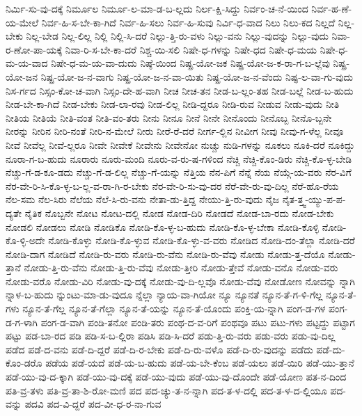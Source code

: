 {ನಿರ್ಮಿ-ಸು-ವು-ದಕ್ಕೆ
ನಿರ್ಮೂಲ
ನಿರ್ಮೂ-ಲ-ಮಾ-ಡ-ಬ-ಲ್ಲದು
ನಿರ್ಲ-ಕ್ಷಿ-ಸಿದ್ದು
ನಿರ್ವಂ-ಚ-ನೆ-ಯಿಂದ
ನಿರ್ವ-ಹ-ಣೆ-ಯ-ಮೇಲೆ
ನಿರ್ವ-ಹಿ-ಸ-ಬೇ-ಕಾ-ಗಿದೆ
ನಿರ್ವ-ಹಿ-ಸಲು
ನಿರ್ವ-ಹಿ-ಸುವು
ನಿರ್ವಿ-ಧ-ವಾದ
ನಿಲು
ನಿಲು-ಕದ
ನಿಲ್ಲದೆ
ನಿಲ್ಲ-ಬೇಕು
ನಿಲ್ಲ-ಬೇಡ
ನಿಲ್ಲ-ಲಿಲ್ಲ
ನಿಲ್ಲಿ
ನಿಲ್ಲಿ-ಸಿ-ದರೆ
ನಿಲ್ಲು-ತ್ತಿ-ರು-ವಳು
ನಿಲ್ಲು-ವನು
ನಿಲ್ಲು-ವುದನ್ನು
ನಿಲ್ಲು-ವುದು
ನಿವಾ-ರ-ಣೋ-ಪಾ-ಯಕ್ಕೆ
ನಿವಾ-ರಿ-ಸ-ಬೇ-ಕಾ-ದರೆ
ನಿಶ್ಚ-ಯಿ-ಸಲಿ
ನಿಷೇ-ಧ-ಗಳನ್ನು
ನಿಷೇ-ಧದ
ನಿಷೇ-ಧ-ಮಯ
ನಿಷೇ-ಧ-ಮ-ಯ-ವಾದ
ನಿಷೇ-ಧ-ಮ-ಯ-ವಾ-ದುದು
ನಿಷ್ಠೆ-ಯಿಂದ
ನಿಷ್ಪ್ರ-ಯೋ-ಜಕ
ನಿಷ್ಪ್ರ-ಯೋ-ಜ-ಕ-ರಾ-ಗ-ಬ-ಲ್ಲೆವು
ನಿಷ್ಪ್ರ-ಯೋ-ಜನ
ನಿಷ್ಪ್ರ-ಯೋ-ಜ-ನ-ವಾಗು
ನಿಷ್ಪ್ರ-ಯೋ-ಜ-ನ-ವಾ-ಯಿತು
ನಿಷ್ಪ್ರ-ಯೋ-ಜ-ನ-ವೆಂದು
ನಿಷ್ಫ-ಲ-ವಾ-ಗು-ವುದು
ನಿಸ-ರ್ಗದ
ನಿಸ್ಸಂ-ಕೋ-ಚ-ವಾಗಿ
ನಿಸ್ಸಂ-ದೇ-ಹ-ವಾಗಿ
ನೀಚ
ನೀಚ-ತನ
ನೀಡ-ಬ-ಲ್ಲಂ-ತಹ
ನೀಡ-ಬಲ್ಲೆ
ನೀಡ-ಬ-ಹುದು
ನೀಡ-ಬೇ-ಕಾ-ಗಿದೆ
ನೀಡ-ಬೇಕು
ನೀಡ-ಲಾ-ರವು
ನೀಡ-ಲಿಲ್ಲ
ನೀಡಿ-ದ್ದರೂ
ನೀಡಿ-ರುವ
ನೀಡುವ
ನೀಡು-ವುದು
ನೀತಿ
ನೀತಿಯ
ನೀತಿಯೆ
ನೀತಿ-ವಂತ
ನೀತಿ-ವಂ-ತರು
ನೀನು
ನೀನೂ
ನೀನೆ
ನೀನೇ
ನೀನೊಂದು
ನೀನೊಬ್ಬ
ನೀನೊ-ಬ್ಬನೇ
ನೀರನ್ನು
ನೀರಿನ
ನೀರಿ-ನಂತೆ
ನೀರಿ-ನ-ಮೇಲೆ
ನೀರು
ನೀರೆ-ರೆ-ದರೆ
ನೀರ್ಗ-ಲ್ಲಿನ
ನೀವೀಗ
ನೀವು
ನೀವು-ಗ-ಳೆಲ್ಲ
ನೀವೂ
ನೀವೆ
ನೀವೆಲ್ಲ
ನೀವೆ-ಲ್ಲರೂ
ನೀವೇ
ನೀವೇಕೆ
ನೀವೇನು
ನೀವೇನೋ
ನುಚ್ಚು
ನುಡಿ-ಗಳನ್ನು
ನೂಕಲು
ನೂಕಿ-ದರೆ
ನೂಕಿದ್ದು
ನೂರಾ-ಗ-ಬ-ಹುದು
ನೂರಾರು
ನೂರು-ಮಂದಿ
ನೂರು-ವ-ರು-ಷ-ಗಳಿಂದ
ನೆಚ್ಚಿ
ನೆಚ್ಚಿ-ಕೊಂ-ಡಿರು
ನೆಚ್ಚಿ-ಕೊ-ಳ್ಳ-ಬೇಡಿ
ನೆಚ್ಚು-ಗೆ-ಡ-ಕೂ-ಡದು
ನೆಚ್ಚು-ಗೆ-ಡ-ಲಿಲ್ಲ
ನೆಚ್ಚು-ಗೆ-ಯನ್ನು
ನೆತ್ತಿಯ
ನೆನ-ಪಿಗೆ
ನೆನ್ನೆ
ನೆಯ
ನೆಯ್ಗೆ-ಯ-ವರು
ನೆರ-ವಿಗೆ
ನೆರ-ವೇ-ರಿ-ಸಿ-ಕೊ-ಳ್ಳ-ಬ-ಲ್ಲ-ವ-ರಾ-ಗಿ-ರ-ಬೇಕು
ನೆರ-ವೇ-ರಿ-ಸು-ವು-ದರ
ನೆರೆ-ವೇ-ರು-ವು-ದಿಲ್ಲ
ನೆರೆ-ಹೊ-ರೆಯ
ನೆಲ-ಸಮ
ನೆಲ-ಸಿರು
ನೆಲೆಯ
ನೆಲೆ-ಸಿ-ರು-ವನು
ನೇತಾ-ಡು-ತ್ತಿದ್ದ
ನೇಯು-ತ್ತಿ-ರು-ವುದು
ನೈಜ
ನೈತ-ತ್ತ್ವ-ಯ್ಯು-ಪ-ಪ-ದ್ಯತೇ
ನೈತಿಕ
ನೊಬ್ಬನೇ
ನೋಟ
ನೋಟ-ದಲ್ಲಿ
ನೋಡ
ನೋಡ-ದಿರಿ
ನೋಡದೆ
ನೋಡ-ಬಾ-ರದು
ನೋಡ-ಬೇಕು
ನೋಡಲಿ
ನೋಡಲು
ನೋಡಿ
ನೋಡಿಕೊ
ನೋಡಿ-ಕೊ-ಳ್ಳ-ಬ-ಹುದು
ನೋಡಿ-ಕೊ-ಳ್ಳ-ಬೇಕಾ
ನೋಡಿ-ಕೊಳ್ಳಿ
ನೋಡಿ-ಕೊ-ಳ್ಳಿ-ಅದೇ
ನೋಡಿ-ಕೊಳ್ಳು
ನೋಡಿ-ಕೊ-ಳ್ಳುವ
ನೋಡಿ-ಕೊ-ಳ್ಳು-ವ-ವರು
ನೋಡಿದ
ನೋಡಿ-ದಂ-ತೆಲ್ಲಾ
ನೋಡಿ-ದರೆ
ನೋಡಿ-ದಾಗ
ನೋಡಿದೆ
ನೋಡಿ-ರು-ವರು
ನೋಡಿ-ರು-ವೆನು
ನೋಡಿ-ರು-ವೆವು
ನೋಡು
ನೋಡು-ತ್ತ-ದೆಯೊ
ನೋಡು-ತ್ತಾನೆ
ನೋಡು-ತ್ತಿ-ರು-ವೆನು
ನೋಡು-ತ್ತಿ-ರು-ವೆವು
ನೋಡು-ತ್ತೀರಿ
ನೋಡು-ತ್ತೇವೆ
ನೋಡು-ವನೊ
ನೋಡು-ವರು
ನೋಡು-ವರೊ
ನೋಡು-ವಿರಿ
ನೋಡು-ವು-ದಕ್ಕೆ
ನೋಡು-ವು-ದಿ-ಲ್ಲವೊ
ನೋಡು-ವೆವು
ನೋಡೋಣ
ನೋವನ್ನು
ನ್ನಾಗಿ
ನ್ನಾಳ-ಬ-ಹುದು
ನ್ನುಂಟು-ಮಾ-ಡು-ವುದೂ
ನ್ನೆಲ್ಲಾ
ನ್ಯಾಯ-ವಾ-ಗಿಯೋ
ನ್ಯೂ
ನ್ಯೂನತೆ
ನ್ಯೂನ-ತೆ-ಗ-ಳಿ-ಗೆಲ್ಲ
ನ್ಯೂನ-ತೆ-ಗಳು
ನ್ಯೂನ-ತೆ-ಗೆಲ್ಲ
ನ್ಯೂನ-ತೆ-ಗೆಲ್ಲಾ
ನ್ಯೂನ-ತೆ-ಯನ್ನು
ನ್ಯೂನ-ತೆ-ಯೊಂದು
ಪಂಕ್ತಿ-ಯ-ನ್ನಾಗಿ
ಪಂಗ-ಡ-ಗಳ
ಪಂಗ-ಡ-ಗ-ಳಾಗಿ
ಪಂಗ-ಡ-ವಾಗಿ
ಪಂಡಿ-ತನೋ
ಪಂಡಿ-ತರು
ಪಂಥ-ದ-ವ-ರಿಗೆ
ಪಂಥವೂ
ಪಟು
ಪಟು-ಗಳು
ಪಟ್ಟದ್ದು
ಪಟ್ಟಾಗ
ಪಟ್ಟು
ಪಡ-ಬಾ-ರದ
ಪಡಿ
ಪಡಿ-ಸ-ಬ-ಲ್ಲಿರಾ
ಪಡಿಸಿ
ಪಡಿ-ಸಿ-ದರೆ
ಪಡು-ತ್ತಿ-ರು-ವರು
ಪಡು-ವರು
ಪಡು-ವು-ದಿಲ್ಲ
ಪಡೆದ
ಪಡೆ-ದ-ವನು
ಪಡೆ-ದಿ-ದ್ದರೆ
ಪಡೆ-ದಿ-ರ-ಬೇಕು
ಪಡೆ-ದಿ-ರು-ವಳೊ
ಪಡೆ-ದಿ-ರು-ವುದನ್ನು
ಪಡೆದು
ಪಡೆ-ದು-ಕೊಂ-ಡರೊ
ಪಡೆಯ
ಪಡೆ-ಯದೆ
ಪಡೆ-ಯ-ಬ-ಹುದು
ಪಡೆ-ಯ-ಬೇ-ಕೆಂಬ
ಪಡೆ-ಯಲು
ಪಡೆ-ಯಿರಿ
ಪಡೆ-ಯು-ತ್ತಾನೆ
ಪಡೆ-ಯು-ವು-ದ-ಕ್ಕಾಗಿ
ಪಡೆ-ಯು-ವು-ದಕ್ಕೆ
ಪಡೆ-ಯು-ವುದು
ಪಡೆ-ಯು-ವು-ದೊಂದೇ
ಪಡೆ-ಯೋಣ
ಪತ-ನ-ದಿಂದ
ಪತಿ-ವ್ರ-ತಳು
ಪತಿ-ವ್ರ-ತಾ-ಶಿ-ರೋ-ಮಣಿ
ಪದ
ಪದ-ಚ್ಯು-ತ-ನ-ನ್ನಾಗಿ
ಪದ-ತ-ಳ-ದಲ್ಲಿ
ಪದ-ತ-ಳ-ದ-ಲ್ಲಿಯೂ
ಪದ-ವನ್ನು
ಪದವಿ
ಪದ-ವಿ-ದ್ದರೆ
ಪದ-ವೀ-ಧ-ರ-ನಾ-ಗುವ
}
